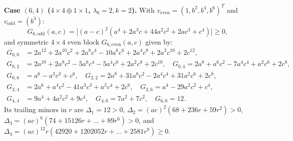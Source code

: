 \documentclass[11pt,a4paper]{article}
\theoremstyle{remark}
\begin{document}
\textbf{Case $(6,4)$ ($4\times 4\oplus 1\times 1$, $\lambda_6=2, k=2$).} With $v_{\mathrm{even}}=(1,b^2,b^4,b^6)^T$ and $v_{\mathrm{odd}}=(b^3)$:
\[
G_{6,\mathrm{odd}}(a,c) = \big[(a-c)^2(a^4+2a^3c+44a^2c^2+2ac^3+c^4)\big] \ge 0,
\]
and symmetric $4\times 4$ even block $G_{6,\mathrm{even}}(a,c)$ given by:
\begin{align*}
  G_{0,0} &= 2a^{12} + 2a^{10}c^2 + 2a^8c^4 - 10a^6c^6 + 2a^4c^8 + 2a^2c^{10} + 2c^{12}, \\
  G_{0,2} &= 2a^{10} + 2a^8c^2 - 5a^6c^4 - 5a^4c^6 + 2a^2c^8 + 2c^{10}, \quad G_{0,4} = 2a^8 + a^6c^2 - 7a^4c^4 + a^2c^6 + 2c^8, \\
  G_{0,6} &= a^6 - a^3c^3 + c^6, \quad G_{2,2} = 2a^8 + 31a^6c^2 - 2a^4c^4 + 31a^2c^6 + 2c^8, \\
  G_{2,4} &= 2a^6 + a^4c^2 - 41a^3c^3 + a^2c^4 + 2c^6, \quad G_{2,6} = a^4 - 29a^2c^2 + c^4, \\
  G_{4,4} &= 9a^4 + 4a^2c^2 + 9c^4, \quad G_{4,6} = 7a^2 + 7c^2, \quad G_{6,6} = 12.
\end{align*}
Its trailing minors in $r$ are $\Delta_1 = 12>0$, $\Delta_2=(ac)^2(68+236r+59r^2)>0$, $\Delta_3=(ac)^6(74+15126r+\dots+89r^6)>0$, and $\Delta_4=(ac)^{12}r(42920+1202052r+\dots+2581r^9)\ge 0$.
\end{document}
